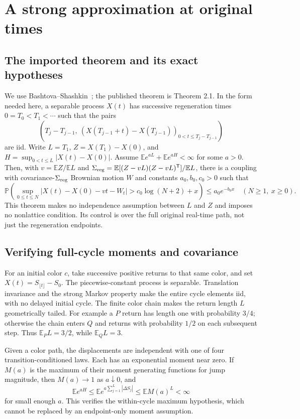\documentclass[11pt,letterpaper]{article}
\theoremstyle{remark}\newtheorem{remark}[theorem]{Remark}
\newcommand{\Prob}{\mathbb P}
\newcommand{\E}{\mathbb E}
\newcommand{\1}{\mathbf1}
\begin{document}
\section{A strong approximation at original times}\label{icw:sec:coupling}
\subsection{The imported theorem and its exact hypotheses}
We use Bashtova--Shashkin~\cite[Conditions (A), (B), Theorem 1,
pp.~3--4]{bs}; the published theorem is Theorem 2.1.
In the form needed here, a separable process $X(t)$ has successive
regeneration times $0=T_0<T_1<\cdots$ such that the pairs
\[
 \left(T_j-T_{j-1},\ (X(T_{j-1}+t)-X(T_{j-1}))_{0<t\le T_j-T_{j-1}}\right)
\]
are iid. Write $L=T_1$, $Z=X(T_1)-X(0)$, and
$H=\sup_{0<t\le L}|X(t)-X(0)|$. Assume
$\E e^{aL}+\E e^{aH}<\infty$ for some $a>0$.
Then, with $v=\E Z/\E L$ and
$\Sigma_{\rm reg}=\E[(Z-vL)(Z-vL)^{\mathsf T}]/\E L$,
there is a coupling with covariance-$\Sigma_{\rm reg}$ Brownian motion
$W$ and constants $a_0,b_0,c_0>0$ such that
\begin{equation}\label{icw:eq:strong-general}
 \Prob\left(\sup_{0\le t\le N}|X(t)-X(0)-vt-W_t|
             >c_0\log(N+2)+x\right)\le a_0e^{-b_0x}
 \quad(N\ge1,\ x\ge0).
\end{equation}
This theorem makes no independence assumption between $L$ and $Z$ and
imposes no nonlattice condition. Its control is over the full original
real-time path, not just the regeneration endpoints.

\subsection{Verifying full-cycle moments and covariance}
For an initial color $c$, take successive positive returns to that same
color, and set $X(t)=S_{\lfloor t\rfloor}-S_0$. The piecewise-constant
process is separable. Translation invariance and the strong Markov
property make the entire cycle elements iid, with no delayed initial
cycle. The finite color chain makes the return length $L$ geometrically
tailed. For example a $P$ return has length one with probability $3/4$;
otherwise the chain enters $Q$ and returns with probability $1/2$ on
each subsequent step. Thus $\E_PL=3/2$, while $\E_QL=3$.

Given a color path, the displacements are independent with one of four
transition-conditioned laws. Each has an exponential moment near zero.
If $M(a)$ is the maximum of their moment generating functions for jump
magnitude, then $M(a)\to1$ as $a\downarrow0$, and
\[
 \E e^{aH}\le\E e^{a\sum_{j=1}^{L}|\Delta S_j|}
 \le\E M(a)^L<\infty
\]
for small enough $a$. This verifies the within-cycle maximum hypothesis,
which cannot be replaced by an endpoint-only moment assumption.
\end{document}
